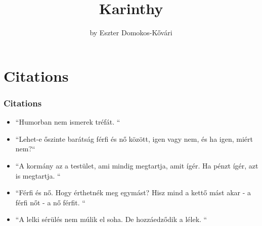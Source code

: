 \documentclass{beamer}
\begin{document}
\author{by Eszter Domokos-Kővári  \\  \tiny }
	
\title{Karinthy} 

\setlength{\parindent}{1em}



    \begin{frame}
    \maketitle
    \end{frame}




\section{Citations}


\begin{frame}

\frametitle {Citations}

   \begin{itemize}
\item   ``Humorban nem ismerek tréfát. `` \par 

\item   ``Lehet-e őszinte barátság férfi és nő között, igen vagy nem, és ha igen, miért nem?`` \par 

\item   ``A kormány az a testület, ami mindig megtartja, amit ígér. Ha pénzt ígér, azt is megtartja. `` \par 

\item   ``Férfi és nő. Hogy érthetnék meg egymást? Hisz mind a kettő mást akar - a férfi nőt - a nő férfit. `` \par 

\item   ``A lelki sérülés nem múlik el soha. De hozzáedződik a lélek. `` \par 
    \end{itemize}

    \end{frame}
\end{document}
